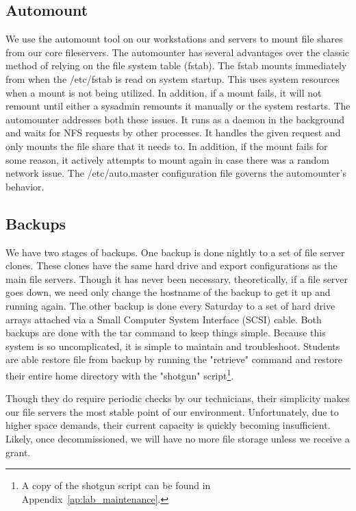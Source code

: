 \subsection{Automount}
We use the automount tool on our workstations and servers to mount file shares from our core fileservers.  The automounter has several advantages over the classic method of relying on the file system table (fstab).  The fstab mounts immediately from when the /etc/fstab is read on system startup.  This uses system resources when a mount is not being utilized.  In addition, if a mount fails, it will not remount until either a sysadmin remounts it manually or the system restarts.  The automounter addresses both these issues.  It runs as a daemon in the background and waits for NFS requests by other processes.  It handles the given request and only mounts the file share that it needs to.  In addition, if the mount fails for some reason, it actively attempts to mount again in case there was a random network issue.  The /etc/auto.master configuration file governs the automounter's behavior.

\subsection{Backups}
We have two stages of backups.  One backup is done nightly to a set of file server clones.  These clones have the same hard drive and export configurations as the main file servers.  Though it has never been necessary, theoretically, if a file server goes down, we need only change the hostname of the backup to get it up and running again.  The other backup is done every Saturday to a set of hard drive arrays attached via a Small Computer System Interface (SCSI) cable.  Both backups are done with the tar command to keep things simple.  Because this system is so uncomplicated, it is simple to maintain and troubleshoot.  Students are able restore file from backup by running the "retrieve" command and restore their entire home directory with the "shotgun" script\footnote{A copy of the shotgun script can be found in Appendix~\ref{ap:lab_maintenance}.}.

Though they do require periodic checks by our technicians, their simplicity makes our file servers the most stable point of our environment.  Unfortunately, due to higher space demands, their current capacity is quickly becoming insufficient.  Likely, once decommissioned, we will have no more file storage unless we receive a grant.   

